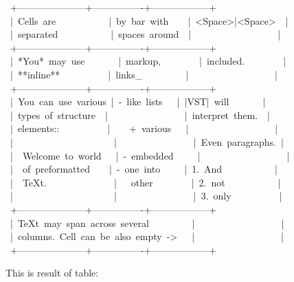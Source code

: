 \documentclass[12pt]{article}
\begin{document}
\begin{ttfamily}\begin{flushleft}
\mbox{~+---------------------+----------------+------------------+}\\
\mbox{~|~Cells~are~~~~~~~~~~~|~by~bar~with~~~~|~<Space>|<Space>~~|}\\
\mbox{~|~separated~~~~~~~~~~~|~spaces~around~~|~~~~~~~~~~~~~~~~~~|}\\
\mbox{~+---------------------+----------------+------------------+}\\
\mbox{~|~*You*~may~use~~~~~~~|~markup,~~~~~~~~|~included.~~~~~~~~|}\\
\mbox{~|~**inline**~~~~~~~~~~|~links\_~~~~~~~~~|~~~~~~~~~~~~~~~~~~|}\\
\mbox{~+---------------------+----------------+------------------+}\\
\mbox{~|~You~can~use~various~|~-~like~lists~~~|~|VST|~will~~~~~~~|}\\
\mbox{~|~types~of~structure~~|~~~~~~~~~~~~~~~~|~interpret~them.~~|}\\
\mbox{~|~elements::~~~~~~~~~~|~~~~+~various~~~|~~~~~~~~~~~~~~~~~~|}\\
\mbox{~|~~~~~~~~~~~~~~~~~~~~~|~~~~~~~~~~~~~~~~|~Even~paragraphs.~|}\\
\mbox{~|~~Welcome~to~world~~~|~-~embedded~~~~~|~~~~~~~~~~~~~~~~~~|}\\
\mbox{~|~~of~preformatted~~~~|~-~one~into~~~~~|~1.~And~~~~~~~~~~~|}\\
\mbox{~|~~\TeX{}t.~~~~~~~~~~~~~~|~~~other~~~~~~~~|~2.~not~~~~~~~~~~~|}\\
\mbox{~|~~~~~~~~~~~~~~~~~~~~~|~~~~~~~~~~~~~~~~|~3.~only~~~~~~~~~~|}\\
\mbox{~+---------------------+----------------+------------------+}\\
\mbox{~|~\TeX{}t~may~span~across~several~~~~~~~~~|~~~~~~~~~~~~~~~~~~|}\\
\mbox{~|~columns.~Cell~can~be~also~empty~->~~~|~~~~~~~~~~~~~~~~~~|}\\
\mbox{~+---------------------+----------------+------------------+}\\
\end{flushleft}\end{ttfamily}

This is result of table:
\end{document}
